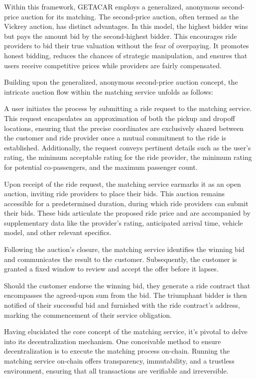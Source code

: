 Within this framework, GETACAR employs a generalized, anonymous second-price auction for its matching. The second-price auction, often termed as the Vickrey auction, has distinct advantages. In this model, the highest bidder wins but pays the amount bid by the second-highest bidder. This encourages ride providers to bid their true valuation without the fear of overpaying. It promotes honest bidding, reduces the chances of strategic manipulation, and ensures that users receive competitive prices while providers are fairly compensated.


Building upon the generalized, anonymous second-price auction concept, the intricate auction flow within the matching service unfolds as follows:

A user initiates the process by submitting a ride request to the matching service. This request encapsulates an approximation of both the pickup and dropoff locations, ensuring that the precise coordinates are exclusively shared between the customer and ride provider once a mutual commitment to the ride is established. Additionally, the request conveys pertinent details such as the user's rating, the minimum acceptable rating for the ride provider, the minimum rating for potential co-passengers, and the maximum passenger count.

Upon receipt of the ride request, the matching service earmarks it as an open auction, inviting ride providers to place their bids. This auction remains accessible for a predetermined duration, during which ride providers can submit their bids. These bids articulate the proposed ride price and are accompanied by supplementary data like the provider's rating, anticipated arrival time, vehicle model, and other relevant specifics.

Following the auction's closure, the matching service identifies the winning bid and communicates the result to the customer. Subsequently, the customer is granted a fixed window to review and accept the offer before it lapses.

Should the customer endorse the winning bid, they generate a ride contract that encompasses the agreed-upon sum from the bid. The triumphant bidder is then notified of their successful bid and furnished with the ride contract's address, marking the commencement of their service obligation.


Having elucidated the core concept of the matching service, it's pivotal to delve into its decentralization mechanism. One conceivable method to ensure decentralization is to execute the matching process on-chain. Running the matching service on-chain offers transparency, immutability, and a trustless environment, ensuring that all transactions are verifiable and irreversible.


